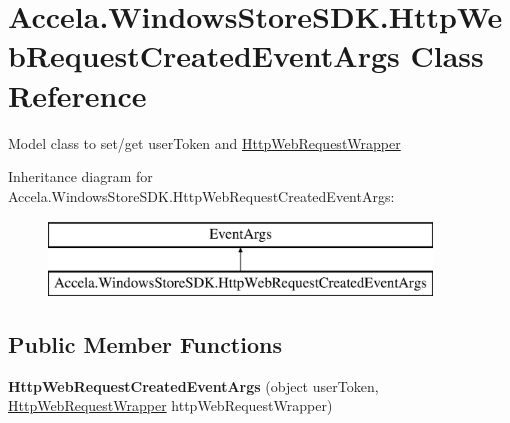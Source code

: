 \hypertarget{class_accela_1_1_windows_store_s_d_k_1_1_http_web_request_created_event_args}{\section{Accela.\+Windows\+Store\+S\+D\+K.\+Http\+Web\+Request\+Created\+Event\+Args Class Reference}
\label{class_accela_1_1_windows_store_s_d_k_1_1_http_web_request_created_event_args}
}


Model class to set/get user\+Token and \hyperlink{class_accela_1_1_windows_store_s_d_k_1_1_http_web_request_wrapper}{Http\+Web\+Request\+Wrapper}  


Inheritance diagram for Accela.\+Windows\+Store\+S\+D\+K.\+Http\+Web\+Request\+Created\+Event\+Args\+:\begin{figure}[H]
\begin{center}
\leavevmode
\includegraphics[height=2.000000cm]{class_accela_1_1_windows_store_s_d_k_1_1_http_web_request_created_event_args}
\end{center}
\end{figure}
\subsection*{Public Member Functions}
\begin{DoxyCompactItemize}
\item 
\hypertarget{class_accela_1_1_windows_store_s_d_k_1_1_http_web_request_created_event_args_a33c00b3717c75832ea50bb85a0bdbce2}{{\bfseries Http\+Web\+Request\+Created\+Event\+Args} (object user\+Token, \hyperlink{class_accela_1_1_windows_store_s_d_k_1_1_http_web_request_wrapper}{Http\+Web\+Request\+Wrapper} http\+Web\+Request\+Wrapper)}\label{class_accela_1_1_windows_store_s_d_k_1_1_http_web_request_created_event_args_a33c00b3717c75832ea50bb85a0bdbce2}

\end{DoxyCompactItemize}
